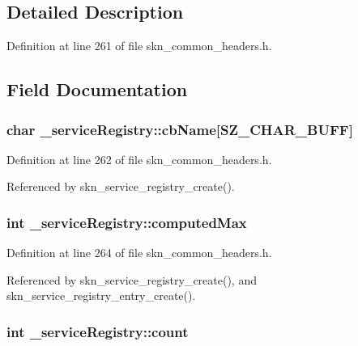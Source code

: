 \subsection{Detailed Description}


Definition at line 261 of file skn\+\_\+common\+\_\+headers.\+h.



\subsection{Field Documentation}
\hypertarget{struct__service_registry_ab822dc7bf25dc0eb498e81f81581e448}{
\subsubsection[{cb\+Name}]{\setlength{\rightskip}{0pt plus 5cm}char \+\_\+service\+Registry\+::cb\+Name\mbox{[}{\bf S\+Z\+\_\+\+C\+H\+A\+R\+\_\+\+B\+U\+F\+F}\mbox{]}}}\label{struct__service_registry_ab822dc7bf25dc0eb498e81f81581e448}


Definition at line 262 of file skn\+\_\+common\+\_\+headers.\+h.



Referenced by skn\+\_\+service\+\_\+registry\+\_\+create().

\hypertarget{struct__service_registry_afc84b25f775a67d768cf4915db3c7115}{
\subsubsection[{computed\+Max}]{\setlength{\rightskip}{0pt plus 5cm}int \+\_\+service\+Registry\+::computed\+Max}}\label{struct__service_registry_afc84b25f775a67d768cf4915db3c7115}


Definition at line 264 of file skn\+\_\+common\+\_\+headers.\+h.



Referenced by skn\+\_\+service\+\_\+registry\+\_\+create(), and skn\+\_\+service\+\_\+registry\+\_\+entry\+\_\+create().

\hypertarget{struct__service_registry_a68062b14c6c9cb411e3602be664425bc}{
\subsubsection[{count}]{\setlength{\rightskip}{0pt plus 5cm}int \+\_\+service\+Registry\+::count}}\label{struct__service_registry_a68062b14c6c9cb411e3602be664425bc}


